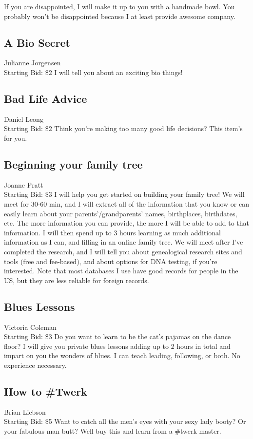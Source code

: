 \documentclass[11pt]{article}
\begin{document}
If you are disappointed, I will make it up to you with a handmade bowl. You probably won't be disappointed because I at least provide awesome company.
\subsection{A Bio Secret}
Julianne Jorgensen
\\
Starting Bid: \$2
\newline
I will tell you about an exciting bio things!
\subsection{Bad Life Advice}
Daniel Leong
\\
Starting Bid: \$2
\newline
Think you're making too many good life decisions? This item's for you.
\subsection{Beginning your family tree}
Joanne Pratt
\\
Starting Bid: \$3
\newline
I will help you get started on building your family tree!  We will meet for 30-60 min, and I will extract all of the information that you know or can easily learn about your parents'/grandparents' names, birthplaces, birthdates, etc.  The more information you can provide, the more I will be able to add to that information. I will then spend up to 3 hours learning as much additional information as I can, and filling in an online family tree.  We will meet after I've completed the research, and I will tell you about genealogical research sites and tools (free and fee-based), and about options for DNA testing, if you're interested.  Note that most databases I use have good records for people in the US, but they are less reliable for foreign records.
\subsection{Blues Lessons}
Victoria Coleman
\\
Starting Bid: \$3
\newline
Do you want to learn to be the cat's pajamas on the dance floor? I will give you private blues lessons adding up to 2 hours in total and impart on you the wonders of blues. I can teach leading, following, or both. No experience necessary.
\subsection{How to \#Twerk}
Brian Liebson
\\
Starting Bid: \$5
\newline
Want to catch all the men's eyes with your sexy lady booty? Or your fabulous man butt? Well buy this and learn from a \#twerk master.
\end{document}
